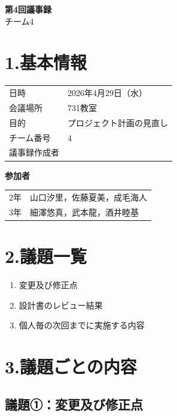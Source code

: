 \documentclass[a4paper,12pt]{ltjsarticle}
\begin{document}
\begin{center}
  {\Large \textbf{第4回議事録}}\\[8pt]
  {\large チーム4}
\end{center}

\vspace{4mm}

\section*{1.基本情報}
\begin{tabular}{ll}
  \toprule
  日時     & 2026年4月29日（水） \\
  会議場所 & 731教室 \\
  目的     & プロジェクト計画の見直し \\
  チーム番号 & 4 \\
  議事録作成者 &  \\
  \bottomrule
\end{tabular}

\vspace{4mm}
\noindent\textbf{参加者}

\begin{tabular}{ll}
  2年 & 山口汐里，佐藤夏美，成毛海人 \\
  3年 & 細澤悠真，武本龍，酒井睦基 \\
\end{tabular}

\section*{2.議題一覧}
\begin{enumerate}[label=議題\arabic*：]
  \item 変更及び修正点
  \item 設計書のレビュー結果
  \item 個人毎の次回までに実施する内容
\end{enumerate}

\section*{3.議題ごとの内容}

\subsection*{議題①：変更及び修正点}
\end{document}
